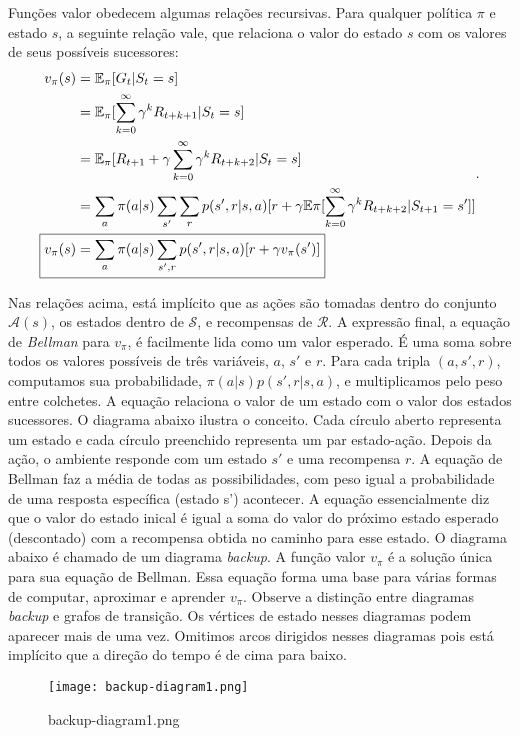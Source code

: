 \documentclass{article}
\begin{document}
Funções valor obedecem algumas relações recursivas. Para qualquer política $\pi$ e estado $s$, a seguinte relação vale, que relaciona o valor do estado $s$ com os valores de seus possíveis sucessores:
\[
\begin{align*}
  v_{\pi}(s)&=\mathbb{E}_{\pi}[G_t|S_t=s]\\
            &=\mathbb{E}_{\pi}[\sum_{k=0}^{\infty} {\gamma}^kR_{t+k+1}|S_t=s]\\
            &=\mathbb{E}_{\pi}[R_{t+1}+\gamma\sum_{k=0}^{\infty} {\gamma}^kR_{t+k+2}|S_t=s]\\
            &=\sum_{a}\pi(a|s) \sum_{s'}\sum_{r}p(s',r|s,a)[r+\gamma \mathbb{E}{\pi}[\sum_{k=0}^{\infty} {\gamma}^kR_{t+k+2}|S_{t+1}=s']]\\
  \Aboxed{v_{\pi}(s)&=\sum_{a}\pi(a|s) \sum_{s',r}p(s',r|s,a)[r+\gamma v_{\pi}(s')]}
\end{align*}
.\] 

Nas relações acima, está implícito que as ações são tomadas dentro do conjunto $\mathcal{A}(s)$, os estados dentro de $\mathcal{S}$, e recompensas de $\mathcal{R}$. A expressão final, a equação de \textit{Bellman} para $v_{\pi}$, é facilmente lida como um valor esperado. É uma soma sobre todos os valores possíveis de três variáveis, $a$, $s'$ e $r$. Para cada tripla $(a,s',r)$, computamos sua probabilidade, $\pi(a|s)p(s',r|s,a)$, e multiplicamos pelo peso entre colchetes. A equação relaciona o valor de um estado com o valor dos estados sucessores. O diagrama abaixo ilustra o conceito. Cada círculo aberto representa um estado e cada círculo preenchido representa um par estado-ação. Depois da ação, o ambiente responde com um estado $s'$ e uma recompensa $r$. A equação de Bellman faz a média de todas as possibilidades, com peso igual a probabilidade de uma resposta específica (estado s') acontecer. A equação essencialmente diz que o valor do estado inical é igual a soma do valor do próximo estado esperado (descontado) com a recompensa obtida no caminho para esse estado. O diagrama abaixo é chamado de um diagrama \textit{backup}. A função valor $v_{\pi}$ é a solução única para sua equação de Bellman. Essa equação forma uma base para várias formas de computar, aproximar e aprender $v_{\pi}$. Observe a distinção entre diagramas \textit{backup} e grafos de transição. Os vértices de estado nesses diagramas podem aparecer mais de uma vez. Omitimos arcos dirigidos nesses diagramas pois está implícito que a direção do tempo é de cima para baixo.

\begin{figure}[htpb]
  \centering
  \texttt{[image: backup-diagram1.png]}
  \caption{backup-diagram1.png}
  \label{fig:backup-diagram1-png}
\end{figure}
 
\end{document}
